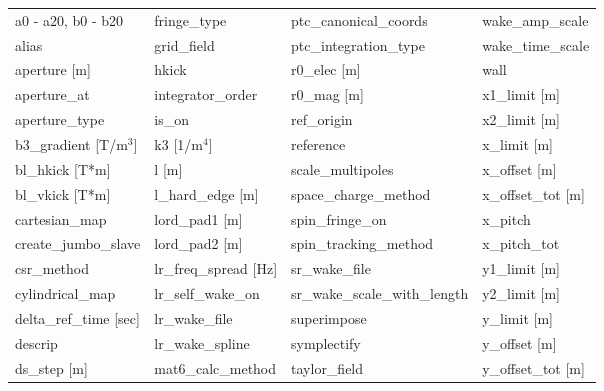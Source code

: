  \begin{tabular}{llll} \toprule
a0 - a20, b0 - b20             & fringe_type                    & ptc_canonical_coords           & wake_amp_scale                 \\
alias                          & grid_field                     & ptc_integration_type           & wake_time_scale                \\
aperture [m]                   & hkick                          & r0_elec [m]                    & wall                           \\
aperture_at                    & integrator_order               & r0_mag [m]                     & x1_limit [m]                   \\
aperture_type                  & is_on                          & ref_origin                     & x2_limit [m]                   \\
b3_gradient [T/m$^3$]          & k3 [1/m$^4$]                   & reference                      & x_limit [m]                    \\
bl_hkick [T*m]                 & l [m]                          & scale_multipoles               & x_offset [m]                   \\
bl_vkick [T*m]                 & l_hard_edge [m]                & space_charge_method            & x_offset_tot [m]               \\
cartesian_map                  & lord_pad1 [m]                  & spin_fringe_on                 & x_pitch                        \\
create_jumbo_slave             & lord_pad2 [m]                  & spin_tracking_method           & x_pitch_tot                    \\
csr_method                     & lr_freq_spread [Hz]            & sr_wake_file                   & y1_limit [m]                   \\
cylindrical_map                & lr_self_wake_on                & sr_wake_scale_with_length      & y2_limit [m]                   \\
delta_ref_time [sec]           & lr_wake_file                   & superimpose                    & y_limit [m]                    \\
descrip                        & lr_wake_spline                 & symplectify                    & y_offset [m]                   \\
ds_step [m]                    & mat6_calc_method               & taylor_field                   & y_offset_tot [m]               \\

\end{tabular}
